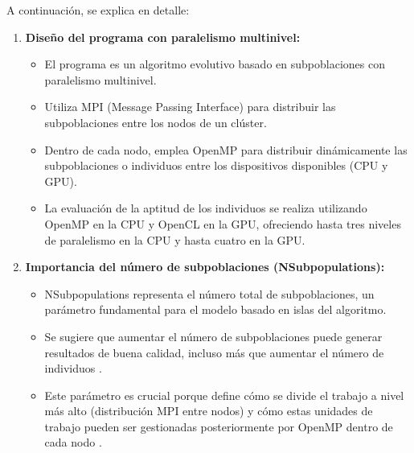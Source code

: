 A continuación, se explica en detalle:

\begin{enumerate}
    \item \textbf{Diseño del programa con paralelismo multinivel:}
          \begin{itemize}
              \item El programa es un algoritmo evolutivo basado en subpoblaciones con paralelismo multinivel.
              \item Utiliza MPI (Message Passing Interface) para distribuir las subpoblaciones entre los nodos de un clúster.
              \item Dentro de cada nodo, emplea OpenMP para distribuir dinámicamente las subpoblaciones o individuos entre los dispositivos disponibles (CPU y GPU).
              \item La evaluación de la aptitud de los individuos se realiza utilizando OpenMP en la CPU y OpenCL en la GPU, ofreciendo hasta tres niveles de paralelismo en la CPU y hasta cuatro en la GPU.
          \end{itemize}

    \item \textbf{Importancia del número de subpoblaciones (NSubpopulations):}
          \begin{itemize}
              \item NSubpopulations representa el número total de subpoblaciones, un parámetro fundamental para el modelo basado en islas del algoritmo.
              \item Se sugiere que aumentar el número de subpoblaciones puede generar resultados de buena calidad, incluso más que aumentar el número de individuos \cite{escobar2020energy}.
              \item Este parámetro es crucial porque define cómo se divide el trabajo a nivel más alto (distribución MPI entre nodos) y cómo estas unidades de trabajo pueden ser gestionadas posteriormente por OpenMP dentro de cada nodo \cite{escobar2020energy}.
          \end{itemize}


\end{enumerate}
